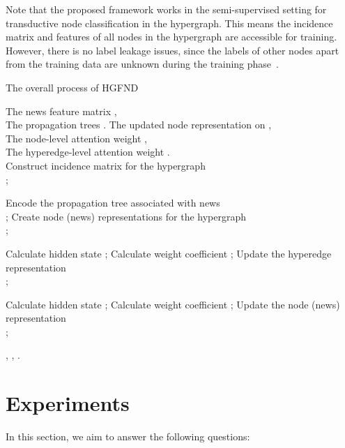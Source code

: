 \documentclass[conference]{IEEEtran}
\begin{document}
Note that the proposed framework works in the semi-supervised setting for transductive node classification in the hypergraph. This means the incidence matrix and features of all nodes in the hypergraph are accessible for training. However, there is no label leakage issues, since the labels of other nodes apart from the training data are unknown during the training phase~\cite{zhou2003learning}.



\begin{algorithm}
\caption{The overall process of HGFND}
\begin{algorithmic}[1]
\REQUIRE The news feature matrix ,\\
\hspace*{1.2em} The propagation trees . 
\ENSURE The updated node representation on ,\\
\hspace*{1.9em} The node-level attention weight ,\\
\hspace*{1.9em} The hyperedge-level attention weight .\\
\STATE Construct incidence matrix for the hypergraph \\
;

\FOR{}
\STATE Encode the propagation tree associated with news\\
;
\STATE Create node (news) representations for the hypergraph \\
;

\ENDFOR
\FOR{}

\FOR{}
\STATE Calculate hidden state ;
\STATE Calculate weight coefficient ;
\STATE Update the hyperedge representation \\
;
\ENDFOR

\FOR{}
\STATE Calculate hidden state ;
\STATE Calculate weight coefficient ;
\STATE Update the node (news) representation \\
;
\ENDFOR

\ENDFOR
\RETURN {} , , .
\end{algorithmic}

\end{algorithm}

\section{Experiments}
In this section, we aim to answer the following  questions:
\end{document}
